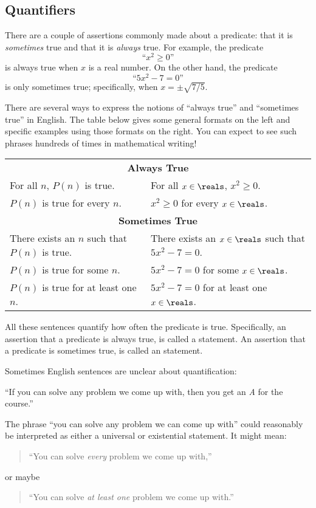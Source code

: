 \begin{editingnoes}
\subsection{Quantifiers}

There are a couple of assertions commonly made about a predicate: that it
is \emph{sometimes} true and that it is \emph{always} true.  For
example, the predicate
%
\[
\text{``$x^2 \geq 0$''}
\]
%
is always true when $x$ is a real number.  On the other hand, the
predicate
%
\[
\text{``$5x^2 - 7 = 0$''}
\]
%
is only sometimes true; specifically, when $x = \pm \sqrt{7/5}$.

There are several ways to express the notions of ``always true'' and
``sometimes true'' in English.  The table below gives some general
formats on the left and specific examples using those formats on the
right.  You can expect to see such phrases hundreds of times in
mathematical writing!
%
\begin{center}
\begin{tabular}{ll}
\multicolumn{2}{c}{\textbf{Always True}} \\[1ex]
For all $n$, $P(n)$ is true. & For all $x \in \reals$, $x^2 \geq 0$. \\
$P(n)$ is true for every $n$. & $x^2 \geq 0$ for every $x \in \reals$. \\[2ex]
\multicolumn{2}{c}{\textbf{Sometimes True}} \\[1ex]
There exists an $n$ such that $P(n)$ is true. & There exists an $x \in \reals$ such that $5x^2 - 7 = 0$.\\
$P(n)$ is true for some $n$. & $5x^2 - 7 = 0$ for some $x \in \reals$.\\
$P(n)$ is true for at least one $n$. & $5x^2-7=0$ for at least one $x \in \reals$.
\end{tabular}
\end{center}

All these sentences quantify how often the predicate is true.
Specifically, an assertion that a predicate is always true, is called
a  statement.  An assertion that a
predicate is sometimes true, is called an  statement.

Sometimes English sentences are unclear about quantification:
%
\begin{center}
  ``If you can solve any problem we come up with, then you get an \emph{A}
  for the course.''
\end{center}
%
The phrase ``you can solve any problem we can come up with'' could
reasonably be interpreted as either a universal or existential
statement.  It might mean:
%
\begin{quote}
``You can solve \emph{every} problem we come up with,''
\end{quote}
or maybe
\begin{quote}
``You can solve \emph{at least one} problem we come up with.''
\end{quote}


\end{editingnoes}
